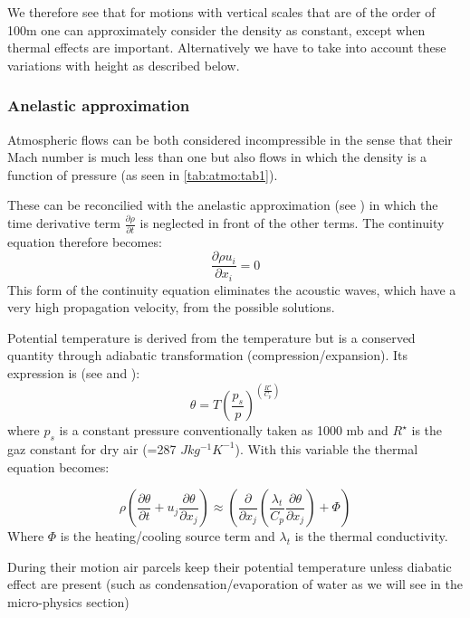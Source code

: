 We therefore see that for motions with vertical scales that are of the order
of 100m one can approximately consider the density as constant, except when
thermal effects are important. Alternatively we have to take into account
these variations with height as described below.

\subsubsection{Anelastic approximation}
Atmospheric flows can be both considered incompressible in the sense that
their Mach number is much less than one but also flows in which the density
is a function of pressure (as seen in \tablename{} \ref{tab:atmo:tab1}).

These can be reconcilied with the anelastic approximation (see \cite{Pielke:1984})
 in which the time derivative term $\frac{\partial \rho }{\partial
t}$ is neglected in front of the other terms. The continuity equation
therefore becomes:
\begin{equation}
\frac{\partial \rho u_{i} }{\partial x_{i} }=0
\end{equation}
This form of the continuity equation eliminates the acoustic waves, which
have a very high propagation velocity, from the possible solutions.

Potential temperature is derived from the temperature but is a conserved
quantity through adiabatic transformation (compression/expansion). Its
expression is (see \cite{Holton:1979} and \cite{Stull:1988}):
\begin{equation}
\label{eq1}
\theta =T\left( {\frac{p_{s}}{p}} \right)^{\left( {\frac{R^{\star }}{C_{p}}} \right)}
\end{equation}
where $p_{s}$ is a constant pressure conventionally taken as 1000 mb
and $R^{\star}$ is the gaz constant for dry air (=287 $Jkg^{-1}K^{-1}$).
With this variable the thermal equation becomes:

\begin{equation}
\rho \left( {\frac{\partial \theta }{\partial t}+u_{j} \frac{\partial \theta
}{\partial x_{j} }} \right)\approx\left( {\frac{\partial }{\partial x_{j}
}\left( {\frac{\lambda_{t} }{C_{p} }\frac{\partial \theta}{\partial x_{j} }}
\right)+\Phi } \right)
\end{equation}
Where $\Phi $ is the heating/cooling source term and $\lambda_{t}$ is the thermal conductivity.

During their motion air parcels keep their potential temperature unless
diabatic effect are present (such as condensation/evaporation of water as we
will see in the micro-physics section)

